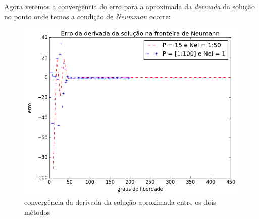  Agora veremos a convergência do erro para a aproximada da \emph{derivada} da solução no ponto onde temos a condição de \emph{Neumman} ocorre:
\begin{figure}[H]
\centering
\includegraphics[width=.8\textwidth,center]{figuras/erro_derivada.png}
\caption{convergência da derivada da solução aproximada entre os dois métodos} 
\end{figure}
